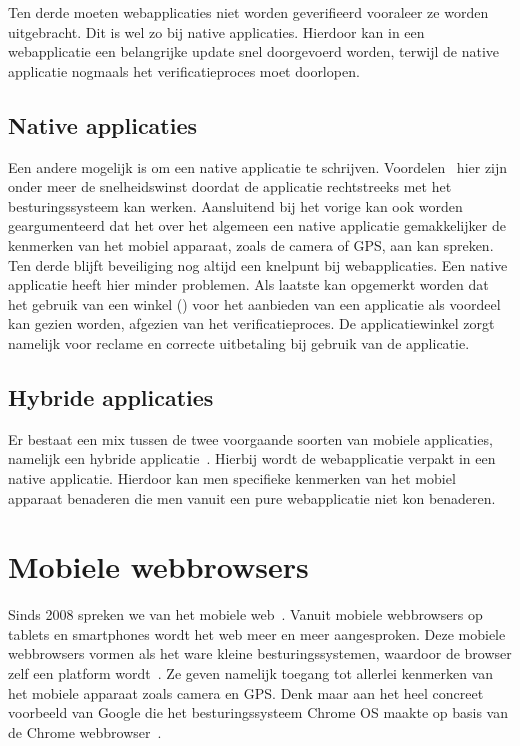 Ten derde moeten webapplicaties niet worden geverifieerd vooraleer ze worden uitgebracht. Dit is wel zo bij native applicaties. Hierdoor kan in een webapplicatie een belangrijke update snel doorgevoerd worden, terwijl de native applicatie nogmaals het verificatieproces moet doorlopen.

\subsection{Native applicaties}
Een andere mogelijk is om een native applicatie te schrijven. Voordelen~\cite{Accenture2012} hier zijn onder meer de snelheidswinst doordat de applicatie rechtstreeks met het besturingssysteem kan werken. Aansluitend bij het vorige kan ook worden geargumenteerd dat het over het algemeen een native applicatie gemakkelijker de kenmerken van het mobiel apparaat, zoals de camera of GPS, aan kan spreken. Ten derde blijft beveiliging nog altijd een knelpunt bij webapplicaties. Een native applicatie heeft hier minder problemen. Als laatste kan opgemerkt worden dat het gebruik van een winkel () voor het aanbieden van een applicatie als voordeel kan gezien worden, afgezien van het verificatieproces. De applicatiewinkel zorgt namelijk voor reclame en correcte uitbetaling bij gebruik van de applicatie.

\subsection{Hybride applicaties}
Er bestaat een mix tussen de twee voorgaande soorten van mobiele applicaties, namelijk een hybride applicatie~\cite{Accenture2012}. Hierbij wordt de webapplicatie verpakt in een native applicatie. Hierdoor kan men specifieke kenmerken van het mobiel apparaat benaderen die men vanuit een pure webapplicatie niet kon benaderen.


\section{Mobiele webbrowsers}
\label{sec:mobiele-webbrowsers}
Sinds 2008 spreken we van het mobiele web~\cite{Hales2012}. 
Vanuit mobiele webbrowsers op tablets en smartphones wordt het web meer en meer aangesproken. 
Deze mobiele webbrowsers vormen als het ware kleine besturingssystemen, waardoor de browser zelf een platform wordt~\cite{Hales2012}. 
Ze geven namelijk toegang tot allerlei kenmerken van het mobiele apparaat zoals camera en GPS. 
Denk maar aan het heel concreet voorbeeld van Google die het besturingssysteem Chrome OS maakte op basis van de Chrome webbrowser~\cite{Hales2012}.

